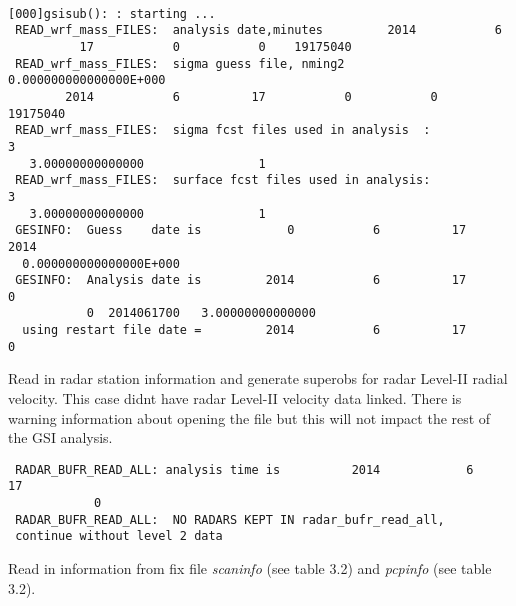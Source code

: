 \begin{scriptsize}
\begin{verbatim}
   
[000]gsisub(): : starting ...
 READ_wrf_mass_FILES:  analysis date,minutes         2014           6
          17           0           0    19175040
 READ_wrf_mass_FILES:  sigma guess file, nming2   0.000000000000000E+000
        2014           6          17           0           0    19175040
 READ_wrf_mass_FILES:  sigma fcst files used in analysis  :             3
   3.00000000000000                1
 READ_wrf_mass_FILES:  surface fcst files used in analysis:             3
   3.00000000000000                1
 GESINFO:  Guess    date is            0           6          17        2014
  0.000000000000000E+000
 GESINFO:  Analysis date is         2014           6          17           0
           0  2014061700   3.00000000000000
  using restart file date =         2014           6          17           0
\end{verbatim}
\end{scriptsize}
Read in radar station information and generate superobs for radar Level-II radial velocity. This case didn\textquotesingle t have radar Level-II velocity data linked. There is warning information about opening the file but this will not impact the rest of the GSI analysis.
\begin{scriptsize}
\begin{verbatim}
 RADAR_BUFR_READ_ALL: analysis time is          2014            6           17
            0
 RADAR_BUFR_READ_ALL:  NO RADARS KEPT IN radar_bufr_read_all,
 continue without level 2 data
\end{verbatim}
\end{scriptsize}

Read in information from fix file \textit{scaninfo} (see table 3.2) and \textit{pcpinfo} (see table 3.2). 

